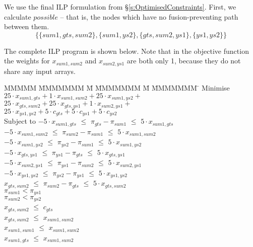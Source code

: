 We use the final ILP formulation from \S\ref{s:OptimisedConstraints}. First, we calculate $possible$ -- that is, the nodes which have no fusion-preventing path between them.
\[ \{ \{sum1, gts, sum2\}
 , \{sum1, ys2\}
 , \{gts, sum2, ys1\}
 , \{ys1, ys2\} \} \]

The complete ILP program is shown below. Note that in the objective function the weights for $x_{sum1, sum2}$ and $x_{sum2, ys1}$ are both only 1, because they do not share any input arrays.

\begin{tabbing}
MMMMM   \= MMMMMMM \= M \= MMMMMMM \= M \= MMMMMMM \= \kill
Minimise   \> $25 \cdot x_{sum1, gts} + 1  \cdot x_{sum1,sum2} + 25 \cdot x_{sum1, ys2} +$ \\
           \> $25 \cdot x_{gts, sum2} + 25 \cdot x_{gts, ys1} + 1 \cdot x_{sum2, ys1} +$ \\
           \> $25 \cdot x_{ys1, ys2}  + 5  \cdot c_{gts} + 5 \cdot c_{ys1} + 5 \cdot c_{ys2} $
\\[0.5ex]
Subject to 
    \> $-5 \cdot x_{sum1, gts}$  \> $\le$ \> $\pi_{gts} - \pi_{sum1}$  \> $\le$ \> $5 \cdot x_{sum1, gts}$  \\
    \> $-5 \cdot x_{sum1, sum2}$ \> $\le$ \> $\pi_{sum2} - \pi_{sum1}$ \> $\le$ \> $5 \cdot x_{sum1, sum2}$ \\
    \> $-5 \cdot x_{sum1, ys2 }$ \> $\le$ \> $\pi_{ys2 } - \pi_{sum1}$ \> $\le$ \> $5 \cdot x_{sum1, ys2 }$ \\
    \> $-5 \cdot x_{gts,  ys1 }$ \> $\le$ \> $\pi_{ys1 } - \pi_{gts }$ \> $\le$ \> $5 \cdot x_{gts, ys1  }$ \\
    \> $-5 \cdot x_{sum2, ys1 }$ \> $\le$ \> $\pi_{ys1 } - \pi_{sum2}$ \> $\le$ \> $5 \cdot x_{sum2, ys1 }$ \\
    \> $-5 \cdot x_{ys1, ys2  }$ \> $\le$ \> $\pi_{ys2 } - \pi_{ys1 }$ \> $\le$ \> $5 \cdot x_{ys1, ys2  }$ 
\\[0.5ex]
    \> $   x_{gts, sum2 }$ \> $\le$ \> $\pi_{sum2} - \pi_{gts }$ \> $\le$ \> $5 \cdot x_{gts, sum2 }$ 
\\[0.5ex]
    \>                     \>       \> $\pi_{sum1} < \pi_{ys1}$ \\
    \>                     \>       \> $\pi_{sum2} < \pi_{ys2}$
\\[0.5ex]
    \> $ x_{gts,sum2} $    \> $\le$ \> $c_{gts}$
\\[0.5ex]
    \> $x_{gts, sum2}$     \> $\le$ \> $x_{sum1, sum2}$ \\
    \> $x_{sum1,sum1}$     \> $\le$ \> $x_{sum1, sum2}$ \\
    \> $x_{sum1, gts}$     \> $\le$ \> $x_{sum1, sum2}$
\end{tabbing}
\noindent

